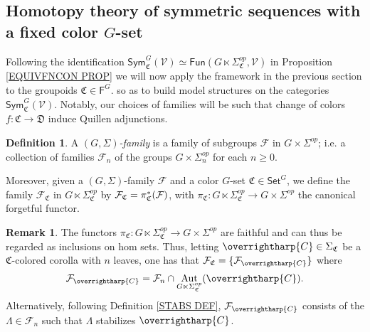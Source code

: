 \documentclass[a4paper,10pt
,draft
]{article}%
\numberwithin{equation}{section}
\numberwithin{figure}{section}
\theoremstyle{definition} %
\newtheorem{definition}[equation]{Definition}%
\newtheorem{remark}[equation]{Remark}%
\newcommand{\vect}[1]{\text{\overrightharp{\ensuremath{#1}}}}
\DeclareMathOperator{\Aut}{Aut}%
\newcommand{\F}{\ensuremath{\mathcal F}}
\newcommand{\V}{\ensuremath{\mathcal V}}
\newcommand{\1}{\ensuremath{\mathbbm 1}}%
\begin{document}
\subsection{Homotopy theory of symmetric sequences with a fixed color $G$-set}
\label{SYMC_MS_SEC}


Following the identification 
$\mathsf{Sym}^G_{\mathfrak{C}}(\V)
\simeq
\mathsf{Fun}(G \ltimes \Sigma^{op}_{\mathfrak{C}},\V)$
in Proposition \ref{EQUIVFNCON PROP}
we will now apply the framework in the previous section 
to the groupoids
$\mathfrak{C} \in \mathsf{F}^G$.
so as to build model structures on the categories 
$\mathsf{Sym}^G_{\mathfrak{C}}(\V)$.
%
Notably, our choices of families will be such that 
change of colors $f\colon \mathfrak{C} \to \mathfrak{D}$ 
induce Quillen adjunctions.



\begin{definition}\label{GSFAM_DEF}
A \emph{$(G,\Sigma)$-family} is a family of subgroups $\mathcal{F}$ in $G \times \Sigma^{op}$;
i.e.
a collection of families $\F_n$ of the groups $G\times \Sigma_n^{op}$ for each $n \geq 0$.
      
Moreover, given a $(G,\Sigma)$-family $\F$ and a color $G$-set $\mathfrak C \in \mathsf{Set}^G$,
we define the family
$\mathcal{F}_{\mathfrak{C}}$ in
$G \ltimes \Sigma^{op}_{\mathfrak{C}}$
by $\mathcal{F}_{\mathfrak{C}} = \pi^{\**}_{\mathfrak{C}}(\mathcal{F})$,
with $\pi_{\mathfrak{C}} \colon G \ltimes \Sigma_{\mathfrak{C}}^{op} \to G \times \Sigma^{op}$
the canonical forgetful functor.
\end{definition}






\begin{remark}
The functors
$\pi_{\mathfrak{C}} \colon
G \ltimes \Sigma_{\mathfrak{C}}^{op} \to
G \times \Sigma^{op}$
are faithful and can thus be regarded as inclusions on hom sets.
Thus, letting $\vect{C} \in \Sigma_{\mathfrak{C}}$ be a
$\mathfrak{C}$-colored corolla with $n$ leaves,
one has that
$\F_{\mathfrak{C}} = \{\F_{\vect{C}}\}$ where
\begin{equation}\label{FAMC_DEF_EQ}
	\F_{\vect{C}} = \F_n \cap \Aut_{G \ltimes \Sigma_{\mathfrak C}^{op}}(\vect C).
\end{equation}
Alternatively, following
Definition \ref{STABS DEF},
$\F_{\vect{C}}$ consists of the $\Lambda \in \F_n$
such that $\Lambda$ stabilizes $\vect{C}$.
\end{remark}
\end{document}
